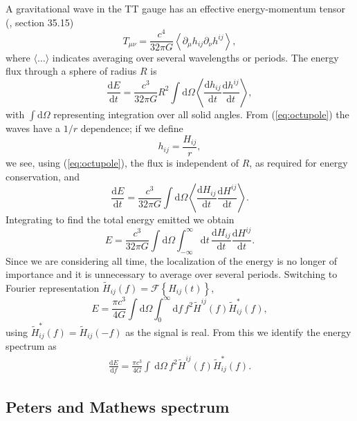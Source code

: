 \documentclass[useAMS,usedcolumn,usegraphicx,usenatbib]{mn2e}
\newcommand{\eqnref}[1]{(\ref{eq:#1})}
\newcommand{\dd}{\ensuremath{\mathrm{d}}}
\newcommand{\diff}[2]{\ensuremath{\frac{\dd {#1}}{\dd {#2}}}}
\newcommand{\intd}[4]{\ensuremath{\int_{#1}^{#2}{#3}\,\dd{#4}}}
\begin{document}
A gravitational wave in the TT gauge has an effective energy-momentum tensor (\citealt{Misner1973}, section 35.15)
\begin{equation}
T_{\mu\nu} = \frac{c^4}{32\pi G}\left\langle\partial_\mu h_{ij} \partial_\nu h^{ij}\right\rangle,
\end{equation}
where $\langle\ldots\rangle$ indicates averaging over several wavelengths or periods. The energy flux through a sphere of radius $R$ is
\begin{equation}
\diff{E}{t} = \frac{c^3}{32\pi G} R^2 \int{\dd\Omega}\left\langle\diff{h_{ij}}{t}\diff{h^{ij}}{t}\right\rangle,
\end{equation}
with $\int{\dd\Omega}$ representing integration over all solid angles. From \eqnref{octupole} the waves have a $1/{r}$ dependence; if we define
\begin{equation}
h_{ij} = \frac{H_{ij}}{r},
\end{equation}
we see, using \eqnref{octupole}, the flux is independent of $R$, as required for energy conservation, and
\begin{equation}
\diff{E}{t} = \frac{c^3}{32\pi G} \int{\dd\Omega}\left\langle\diff{H_{ij}}{t}\diff{H^{ij}}{t}\right\rangle.
\end{equation}
Integrating to find the total energy emitted we obtain
\begin{equation}
E = \frac{c^3}{32\pi G} \int{\dd\Omega}\int_{-\infty}^{\infty}{\dd t} \, \diff{H_{ij}}{t}\diff{H^{ij}}{t}.
\label{eq:integrate_E}
\end{equation}
Since we are considering all time, the localization of the energy is no longer of importance and it is unnecessary to average over several periods. Switching to Fourier representation $\widetilde{H}_{ij}(f) = \mathscr{F}\left\{H_{ij}(t)\right\}$,
\begin{equation}
E = \frac{\pi c^3}{4 G} \int{\dd\Omega}\int_{0}^{\infty}{\dd f} \, f^2 \widetilde{H}^{ij}(f)\widetilde{H}_{ij}^*(f),
\label{eq:total_E}
\end{equation}
using $\widetilde{H}_{ij}^*(f) = \widetilde{H}_{ij}(-f)$ as the signal is real. From this we identify the energy spectrum as
\begin{align}
\diff{E}{f} = \frac{\pi c^3}{4 G} \intd{}{}{}{\Omega} \, f^2 \widetilde{H}^{ij}(f)\widetilde{H}_{ij}^*(f).
\label{eq:NK_dEdf}
\end{align}

\subsection{Peters and Mathews spectrum}
\end{document}
